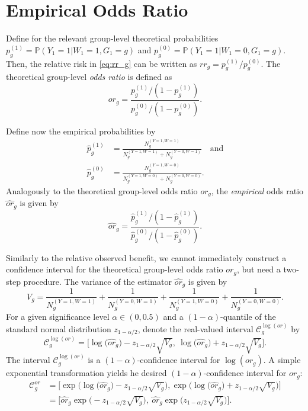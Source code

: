 \documentclass{article}
\begin{document}
\section{Empirical Odds Ratio}
Define for the relevant group-level theoretical probabilities $p_g^{(1)} = \mathbb{P}(Y_1 = 1 | W_1 = 1, G_1 = g)$ and $p_g^{(0)} = \mathbb{P}(Y_1 = 1 | W_1 = 0, G_1 = g)$. Then, the relative risk in \eqref{eq:rr_g} can be written as $rr_g = p_g^{(1)} / p_g^{(0)}$. The theoretical group-level \textit{odds ratio} is defined as
\begin{equation}
    or_g = \frac{p_g^{(1)} / (1 - p_g^{(1)})}{p_g^{(0)} / (1 - p_g^{(0)})}.
\end{equation}

Define now the empirical probabilities by 
\begin{align*}
\hat{p}_g^{(1)} &= \frac{N_g^{(Y=1,W=1)}}{N_g^{(Y=1,W=1)} + N_g^{(Y=0,W=1)}} \quad \text{and}
\\
\hat{p}_g^{(0)} &= \frac{N_g^{(Y=1,W=0)}}{N_g^{(Y=1,W=0)} + N_g^{(Y=0,W=0)}}.
\end{align*}
Analogously to the theoretical group-level odds ratio $or_g$, the \textit{empirical} odds ratio $\widehat{or}_g$ is given by
\begin{equation}
    \widehat{or}_g = \frac{\hat{p}_g^{(1)} / (1 - \hat{p}_g^{(1)})}{\hat{p}_g^{(0)} / (1 - \hat{p}_g^{(0)})}.
\end{equation}

Similarly to the relative observed benefit, we cannot immediately construct a confidence interval for the theoretical group-level odds ratio $or_g$, but need a two-step procedure.
The variance of the estimator $\widehat{or}_g$ is given by
\begin{equation}
    V_g = \frac{1}{N_g^{(Y=1, W=1)}} + 
    \frac{1}{N_g^{(Y=0, W=1)}} +
    \frac{1}{N_g^{(Y=1, W=0)}} + 
    \frac{1}{N_g^{(Y=0, W=0)}}.
\end{equation}
For a given significance level $\alpha \in (0,0.5)$ and a $(1-\alpha)$-quantile of the standard normal distribution $z_{1-\alpha / 2}$, denote the real-valued interval $\mathcal{C}_g^{\log (or)}$ by
\begin{equation}
    \mathcal{C}^{\log(or)}_g
    =
    \Big[
    \log \big( \widehat{or}_g\big) - z_{1-\alpha / 2} \sqrt{V_g},\ 
    \log \big( \widehat{or}_g\big) + z_{1-\alpha / 2} \sqrt{V_g}
    \Big].
\end{equation}
The interval $\mathcal{C}_g^{\log (or)}$ is a $(1-\alpha)$-confidence interval for $\log(or_g)$. A simple exponential transformation yields he desired $(1-\alpha)$-confidence interval for $or_g$:
\begin{equation}
\begin{split}
    \mathcal{C}_g^{or}
    &=
    \Bigg[ 
    \exp\Big( \log \big( \widehat{or}_g\big) - z_{1-\alpha / 2} \sqrt{V_g} \Big),
    \exp\Big( \log \big( \widehat{or}_g\big) + z_{1-\alpha / 2} \sqrt{V_g} \Big)
    \Bigg]
    \\
    &=
   \Bigg[ 
   \widehat{or}_g 
   \exp \Big(
   - z_{1-\alpha / 2} \sqrt{V_g} \Big),\ 
   \widehat{or}_g 
   \exp \Big(
    z_{1-\alpha / 2} \sqrt{V_g} \Big)
    \Bigg].
\end{split}
\end{equation}
\end{document}
